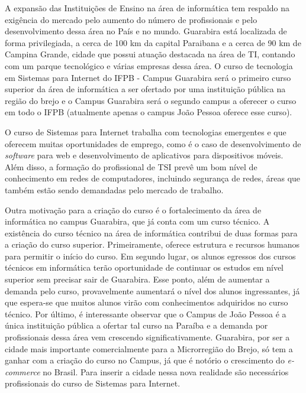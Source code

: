 A expansão das Instituições de Ensino na área de informática tem respaldo na exigência do mercado pelo aumento do número de profissionais e pelo desenvolvimento dessa área no País e no mundo. Guarabira est\'a localizada de forma privilegiada, a cerca de 100 km da capital Paraibana e a cerca de 90 km de Campina Grande, cidade que possui atua\c{c}\~ao destacada na \'area de TI, contando com um parque tecnol\'ogico e v\'arias empresas dessa \'area. O curso de tecnologia em Sistemas para Internet do IFPB - Campus Guarabira ser\'a o primeiro curso superior da \'area de inform\'atica a ser ofertado por uma institui\c{c}\~ao p\'ublica na região do brejo e o Campus Guarabira ser\'a o segundo campus a oferecer o curso em todo o IFPB (atualmente apenas o campus Jo\~ao Pessoa oferece esse curso).

O curso de Sistemas para Internet trabalha com tecnologias emergentes e que oferecem muitas oportunidades de emprego, como é o caso de desenvolvimento de \emph{software} para web e desenvolvimento de aplicativos para dispositivos móveis. Além disso, a formação do profissional de TSI prevê um bom nível de conhecimento em redes de computadores, incluindo segurança de redes, áreas que também estão sendo demandadas pelo mercado de trabalho.

Outra motiva\c{c}\~ao para a criação do curso é o fortalecimento da área de informática no campus Guarabira, que já conta com um curso técnico. A existência do curso técnico na área de informática contribui de duas formas para a criação do curso superior. Primeiramente, oferece estrutura e recursos humanos para permitir o início do curso. Em segundo lugar, os alunos egressos dos cursos técnicos em informática terão oportunidade de continuar os estudos em nível superior sem precisar sair de Guarabira. Esse ponto, além de aumentar a demanda pelo curso, provavelmente aumentará o nível dos alunos ingressantes, já que espera-se que muitos alunos virão com conhecimentos adquiridos no curso técnico. Por último, é interessante observar que o Campus de João Pessoa é a única instituição pública a ofertar tal curso na Paraíba e a demanda por profissionais dessa área vem crescendo significativamente. Guarabira, por ser a cidade mais importante comercialmente para a Microrregião do Brejo, só tem a ganhar com a criação do curso no Campus, já que é notório o crescimento do \textit{e-commerce} no Brasil. Para inserir a cidade nessa nova realidade são necessários profissionais do curso de Sistemas para Internet. %

